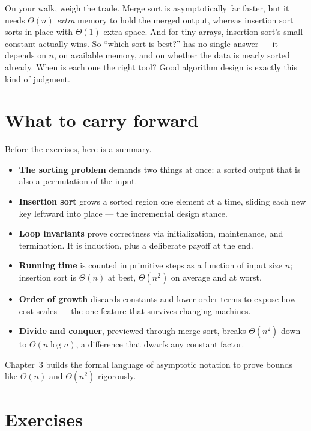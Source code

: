 \begin{walkbox}
On your walk, weigh the trade. Merge sort is asymptotically far faster, but it needs
$\Theta(n)$ \emph{extra} memory to hold the merged output, whereas insertion sort sorts
in place with $\Theta(1)$ extra space. And for tiny arrays, insertion sort's small
constant actually wins. So ``which sort is best?'' has no single answer --- it depends on
$n$, on available memory, and on whether the data is nearly sorted already. When is each
one the right tool? Good algorithm design is exactly this kind of judgment.
\end{walkbox}

\section{What to carry forward}

\begin{recoverybox}
Before the exercises, here is a summary.
\begin{itemize}
  \item \textbf{The sorting problem} demands two things at once: a sorted output that is
        also a permutation of the input.
  \item \textbf{Insertion sort} grows a sorted region one element at a time, sliding each
        new key leftward into place --- the incremental design stance.
  \item \textbf{Loop invariants} prove correctness via initialization, maintenance, and
        termination. It is induction, plus a deliberate payoff at the end.
  \item \textbf{Running time} is counted in primitive steps as a function of input size
        $n$; insertion sort is $\Theta(n)$ at best, $\Theta(n^2)$ on average and at worst.
  \item \textbf{Order of growth} discards constants and lower-order terms to expose how
        cost scales --- the one feature that survives changing machines.
  \item \textbf{Divide and conquer}, previewed through merge sort, breaks $\Theta(n^2)$
        down to $\Theta(n \log n)$, a difference that dwarfs any constant factor.
\end{itemize}
\end{recoverybox}

Chapter~3 builds the formal language of asymptotic notation to prove bounds like $\Theta(n)$ and $\Theta(n^2)$ rigorously.

\section{Exercises}

